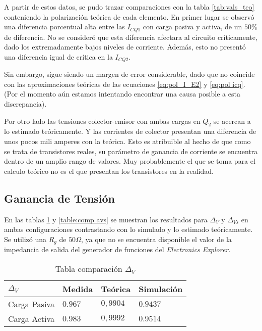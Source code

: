 A partir de estos datos, se pudo trazar comparaciones con la tabla \ref{tab:vals_teo} conteniendo la polarización teórica de cada elemento. En primer lugar se observó una diferencia porcentual alta entre las $I_{CQ1}$ con carga pasiva y activa, de un $50\%$ de diferencia. No se consideró que esta diferencia afectara al circuito críticamente, dado los extremadamente bajos niveles de corriente. Además, esto no presentó una diferencia igual de crítica en la $I_{CQ2}$.

Sin embargo, sigue siendo un margen de error considerable, dado que no coincide con las aproximaciones teóricas de las ecuaciones \eqref{eq:pol_I_E2} y \eqref{eq:pol icq}. (Por el momento aún estamos intentando encontrar una causa posible a esta discrepancia).

Por otro lado las tensiones colector-emisor con ambas cargas en $Q_2$ se acercan a lo estimado teóricamente. Y las corrientes de colector presentan una diferencia de unos pocos mili amperes con la teórica. Esto es atribuible al hecho de que como se trata de transistores reales, su parámetro de ganancia de corriente se encuentra dentro de un amplio rango de valores. Muy probablemente el que se toma para el calculo teórico no es el que presentan los transistores en la realidad.


\subsection{Ganancia de Tensión}

En las tablas \ref{table:comp av} y \ref{table:comp avs} se muestran los resultados para $\Delta_V$ y $\Delta_{Vs}$ en ambas configuraciones contrastando con lo simulado y lo estimado teóricamente.
Se utilizó una $R_g$ de $50\Omega$, ya que no se encuentra disponible el valor de la impedancia de salida del generador de funciones del \textit{Electronics Explorer}.

\begin{table}[ht]
    \centering
    \begin{tabular}{|l|l|l|l|}
    \hline
    $\Delta_V $  & Medida   & Teórica  & Simulación \\ \hline
    Carga Pasiva & $0.967$  & $0,9904$ &  $0.9437$       \\ \hline
    Carga Activa & $0.983$  & $0,9992$ &  $0.9514$          \\ \hline
    \end{tabular}
    \caption{Tabla comparación $\Delta_V$}\label{table:comp av}
\end{table}

